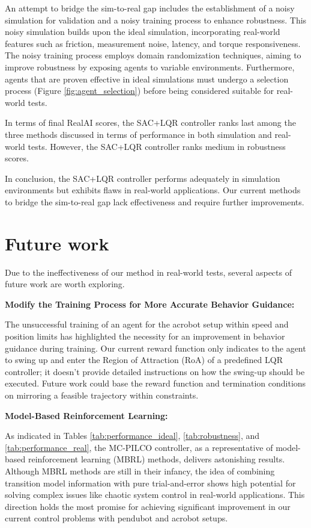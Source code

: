 An attempt to bridge the sim-to-real gap includes the establishment of a noisy simulation for validation and a noisy training process to enhance robustness. This noisy simulation builds upon the ideal simulation, incorporating real-world features such as friction, measurement noise, latency, and torque responsiveness. The noisy training process employs domain randomization techniques, aiming to improve robustness by exposing agents to variable environments. Furthermore, agents that are proven effective in ideal simulations must undergo a selection process (Figure \ref{fig:agent_selection}) before being considered suitable for real-world tests.

In terms of final RealAI scores, the SAC+LQR controller ranks last among the three methods discussed in terms of performance in both simulation and real-world tests. However, the SAC+LQR controller ranks medium in robustness scores.

In conclusion, the SAC+LQR controller performs adequately in simulation environments but exhibits flaws in real-world applications. Our current methods to bridge the sim-to-real gap lack effectiveness and require further improvements.

\section{Future work}
Due to the ineffectiveness of our method in real-world tests, several aspects of future work are worth exploring.

\textbf{Modify the Training Process for More Accurate Behavior Guidance:}

The unsuccessful training of an agent for the acrobot setup within speed and position limits has highlighted the necessity for an improvement in behavior guidance during training. Our current reward function only indicates to the agent to swing up and enter the Region of Attraction (RoA) of a predefined LQR controller; it doesn't provide detailed instructions on how the swing-up should be executed. Future work could base the reward function and termination conditions on mirroring a feasible trajectory within constraints.

\textbf{Model-Based Reinforcement Learning:}

As indicated in Tables \ref{tab:performance_ideal}, \ref{tab:robustness}, and \ref{tab:performance_real}, the MC-PILCO controller, as a representative of model-based reinforcement learning (MBRL) methods, delivers astonishing results. Although MBRL methods are still in their infancy, the idea of combining transition model information with pure trial-and-error shows high potential for solving complex issues like chaotic system control in real-world applications. This direction holds the most promise for achieving significant improvement in our current control problems with pendubot and acrobot setups.


